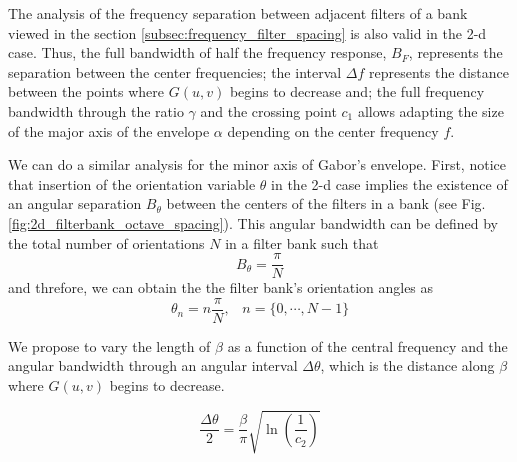 \documentclass[journal]{IEEEtran}
\begin{document}
The analysis of the frequency separation between adjacent filters of a bank viewed in the section \ref{subsec:frequency_filter_spacing} is also valid in the 2-d case. Thus, the full bandwidth of half the frequency response, $B_F$, represents the separation between the center frequencies; the interval $\Delta f$ represents the distance between the points where $G(u, v)$ begins to decrease and; the full frequency bandwidth through the ratio $\gamma$ and the crossing point $c_1$ allows adapting the size of the major axis of the envelope $\alpha$ depending on the center frequency $f$.

We can do a similar analysis for the minor axis of Gabor's envelope. First, notice that insertion of the orientation variable $\theta$ in the 2-d case implies the existence of an angular separation $B_{\theta}$ between the centers of the filters in a bank (see Fig. \ref{fig:2d_filterbank_octave_spacing}). This angular bandwidth can be defined by the total number of orientations $N$ in a filter bank such that
\begin{equation}\label{eq:angular_bandwidth}
    B_{\theta} = \frac{\pi}{N}
\end{equation}
and threfore, we can obtain the the filter bank's orientation angles as 
\begin{equation}\label{eq:filterbank_angles}
    \theta_n = n \frac{\pi}{N} \textrm{,} \quad n = \{0, \cdots, N-1\}
\end{equation}

We propose to vary the length of $\beta$ as a function of the central frequency and the angular bandwidth through an angular interval $\Delta \theta$, which is the distance along $\beta$ where $G(u, v)$ begins to decrease.

\begin{equation}\label{eq:orientation_interval_crossing_point}
    \frac{\Delta \theta}{2} = \frac{\beta}{\pi}\sqrt{\ln \left(\frac{1}{c_2}\right)}
\end{equation}
\end{document}

